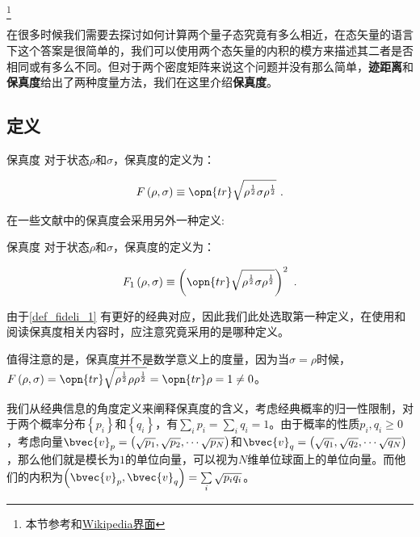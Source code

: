 
\footnote{本节参考\cite{量子信息}和\href{https://en.wikipedia.org/wiki/Trace_distance}{Wikipedia界面}}

在很多时候我们需要去探讨如何计算两个量子态究竟有多么相近，在态矢量的语言下这个答案是很简单的，我们可以使用两个态矢量的内积的模方来描述其二者是否相同或有多么不同。但对于两个密度矩阵来说这个问题并没有那么简单，\textbf{迹距离}和\textbf{保真度}给出了两种度量方法，我们在这里介绍\textbf{保真度}。

\subsection{定义}

\begin{definition}{保真度}\label{def_fideli_1}
对于状态$\rho$和$\sigma$，保真度的定义为：

\begin{equation}\label{eq_fideli_1}
F\left(\rho, \sigma\right)\equiv\opn{tr}\sqrt{\rho^{\frac{1}{2}}\sigma\rho^{\frac{1}{2}}}~.
\end{equation}

\end{definition}

在一些文献中的保真度会采用另外一种定义:

\begin{definition}{保真度}
对于状态$\rho$和$\sigma$，保真度的定义为：

\begin{equation}
F_1\left(\rho, \sigma\right)\equiv\left(\opn{tr}\sqrt{\rho^{\frac{1}{2}}\sigma\rho^{\frac{1}{2}}}\right)^2~.
\end{equation}
\end{definition}

由于\autoref{def_fideli_1} 有更好的经典对应，因此我们此处选取第一种定义，在使用和阅读保真度相关内容时，应注意究竟采用的是哪种定义。

值得注意的是，保真度并不是数学意义上的度量，因为当$\sigma = \rho$时候，$F\left(\rho, \sigma\right) = \opn{tr}\sqrt{\rho^{\frac{1}{2}}\rho\rho^{\frac{1}{2}}} = \opn{tr}\rho = 1 \neq 0$。

我们从经典信息的角度定义来阐释保真度的含义，考虑经典概率的归一性限制，对于两个概率分布$\left\{p_i\right\}$和$\left\{q_i\right\}$，有$\sum\limits_i p_i = \sum\limits_i q_i = 1$。由于概率的性质$p_i,q_i\geqslant 0$，考虑向量$\bvec{v}_p = \left( \sqrt{p_1},\sqrt{p_2},\cdots\sqrt{p_N}\right)$和$\bvec{v}_q = \left( \sqrt{q_1},\sqrt{q_2},\cdots\sqrt{q_N}\right)$，那么他们就是模长为$1$的单位向量，可以视为$N$维单位球面上的单位向量。而他们的内积为$\left(\bvec{v}_p,\bvec{v}_q\right) = \sum\limits_i\sqrt{p_iq_i}$。

